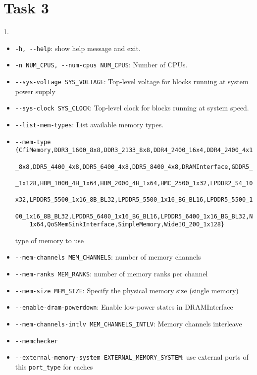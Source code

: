 \documentclass{article}
\begin{document}
\section*{Task 3}
1.\begin{itemize}
	\item \verb|-h, --help|: show help message and exit.
	\item \verb|-n NUM_CPUS, --num-cpus NUM_CPUS|: Number of CPUs.
	\item \verb|--sys-voltage SYS_VOLTAGE|: Top-level voltage for blocks running at system power supply
	\item \verb|--sys-clock SYS_CLOCK|: Top-level clock for blocks running at system speed.
	\item \verb|--list-mem-types|: List available memory types.
	\item \begin{verbatim}--mem-type {CfiMemory,DDR3_1600_8x8,DDR3_2133_8x8,DDR4_2400_16x4,DDR4_2400_4x16,DDR4_2400
	_8x8,DDR5_4400_4x8,DDR5_6400_4x8,DDR5_8400_4x8,DRAMInterface,GDDR5_4000_2x32,HBM_1000_4H
	_1x128,HBM_1000_4H_1x64,HBM_2000_4H_1x64,HMC_2500_1x32,LPDDR2_S4_1066_1x32,LPDDR3_1600_1
	x32,LPDDR5_5500_1x16_8B_BL32,LPDDR5_5500_1x16_BG_BL16,LPDDR5_5500_1x16_BG_BL32,LPDDR5_64
	00_1x16_8B_BL32,LPDDR5_6400_1x16_BG_BL16,LPDDR5_6400_1x16_BG_BL32,NVMInterface,NVM_2400_
	1x64,QoSMemSinkInterface,SimpleMemory,WideIO_200_1x128}\end{verbatim}
	type of memory to use
	\item \verb|--mem-channels MEM_CHANNELS|: number of memory channels
	\item \verb|--mem-ranks MEM_RANKS|: number of memory ranks per channel
	\item \verb|--mem-size MEM_SIZE|: Specify the physical memory size (single memory)
	\item \verb|--enable-dram-powerdown|: Enable low-power states in DRAMInterface
	\item \verb|--mem-channels-intlv MEM_CHANNELS_INTLV|: Memory channels interleave
	\item \verb|--memchecker|
	\item \verb|--external-memory-system EXTERNAL_MEMORY_SYSTEM|: use external ports of this \verb|port_type| for caches


\end{itemize}
\end{document}
